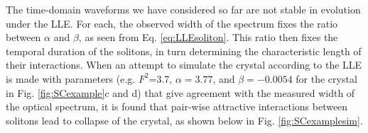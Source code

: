 
The time-domain waveforms we have considered so far are not stable in evolution under the LLE. For each, the observed width of the spectrum fixes the ratio between $\alpha$ and $\beta$, as seen from Eq. \ref{eq:LLEsoliton}. This ratio then fixes the temporal duration of the solitons, in turn determining the characteristic length of their interactions. When an attempt to simulate the crystal according to the LLE is made with parameters (e.g. $F^2$=3.7, $\alpha=3.77$, and $\beta=-0.0054$ for the crystal in Fig. \ref{fig:SCexample}c and d) that give agreement with the measured width of the optical spectrum, it is found that pair-wise attractive interactions between solitons lead to collapse of the crystal, as shown below in Fig. \ref{fig:SCexamplesim}.

